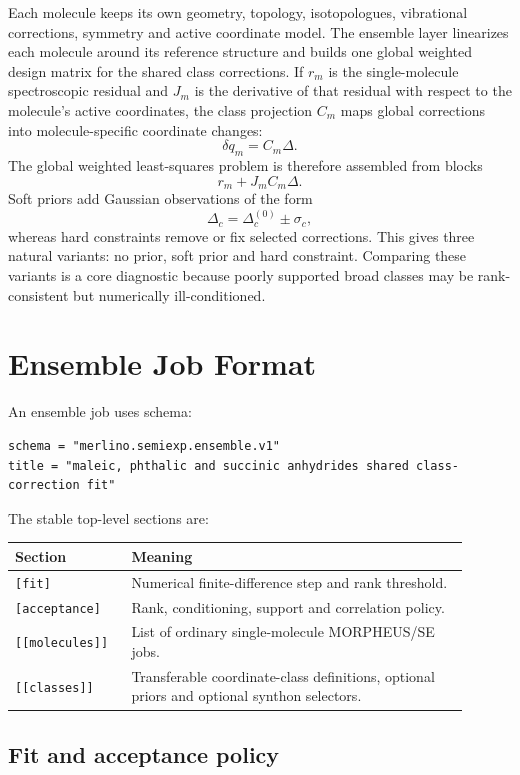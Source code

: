 \documentclass[11pt]{article}
\begin{document}
Each molecule keeps its own geometry, topology, isotopologues, vibrational
corrections, symmetry and active coordinate model.  The ensemble layer
linearizes each molecule around its reference structure and builds one global
weighted design matrix for the shared class corrections.  If \(r_m\) is the
single-molecule spectroscopic residual and \(J_m\) is the derivative of that
residual with respect to the molecule's active coordinates, the class
projection \(C_m\) maps global corrections into molecule-specific coordinate
changes:
\[
  \delta q_m = C_m \Delta .
\]
The global weighted least-squares problem is therefore assembled from blocks
\[
  r_m + J_m C_m \Delta .
\]
Soft priors add Gaussian observations of the form
\[
  \Delta_c = \Delta_c^{(0)} \pm \sigma_c ,
\]
whereas hard constraints remove or fix selected corrections.  This gives three
natural variants: no prior, soft prior and hard constraint.  Comparing these
variants is a core diagnostic because poorly supported broad classes may be
rank-consistent but numerically ill-conditioned.

\section{Ensemble Job Format}

An ensemble job uses schema:

\begin{lstlisting}[style=merlino]
schema = "merlino.semiexp.ensemble.v1"
title = "maleic, phthalic and succinic anhydrides shared class-correction fit"
\end{lstlisting}

\noindent
The stable top-level sections are:

\begin{longtable}{@{}p{0.22\linewidth}p{0.68\linewidth}@{}}
\toprule
Section & Meaning \\
\midrule
\endhead
\texttt{[fit]} & Numerical finite-difference step and rank threshold. \\
\texttt{[acceptance]} & Rank, conditioning, support and correlation policy. \\
\texttt{[[molecules]]} & List of ordinary single-molecule MORPHEUS/SE jobs. \\
\texttt{[[classes]]} & Transferable coordinate-class definitions, optional
priors and optional synthon selectors. \\
\bottomrule
\end{longtable}

\subsection{Fit and acceptance policy}
\end{document}
